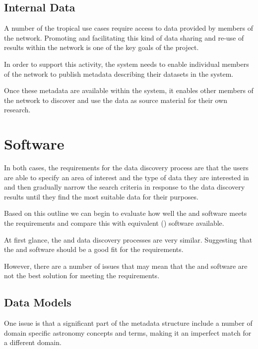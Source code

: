 \documentclass{article}
\begin{document}
\subsection{Internal Data}

A number of the tropical use cases require access to data provided by
members of the \cite{tropo} network. Promoting and facilitating this kind
of data sharing and re-use of results within the \cite{tropo} network is
one of the key goals of the \cite{atrop} project.

In order to support this activity, the \cite{atrop} system needs to enable
individual members of the \cite{tropo} network to publish metadata describing
their datasets in the \cite{atrop} system.

Once these metadata are available within the \cite{atrop} system, it enables
other members of the \cite{tropo} network to discover and use the data as
source material for their own research.

\section{\cite{ivoa} Software}

In both cases, the requirements for the data discovery process are that the
users are able to specify an area of interest and the type of data they are
interested in and then gradually narrow the search criteria in response to
the data discovery results until they find the most suitable data
for their purposes.

Based on this outline we can begin to evaluate how well the \cite{ivoa}
and \cite{astro} software meets the \cite{atrop} requirements and compare
this with equivalent  (\cite{gis}) software available.

At first glance, the \cite{ivoa} and \cite{atrop} data discovery processes
are very similar. Suggesting that the \cite{ivoa} and \cite{astro} software
should be a good fit for the \cite{atrop} requirements.

However, there are a number of issues that may mean that the \cite{ivoa} and
\cite{astro} software are not the best solution for meeting the \cite{atrop}
requirements.

\subsection{Data Models}

One issue is that a significant part of the \cite{ivoa} metadata structure
include a number of domain specific astronomy concepts and terms, making
it an imperfect match for a different domain.
\end{document}
